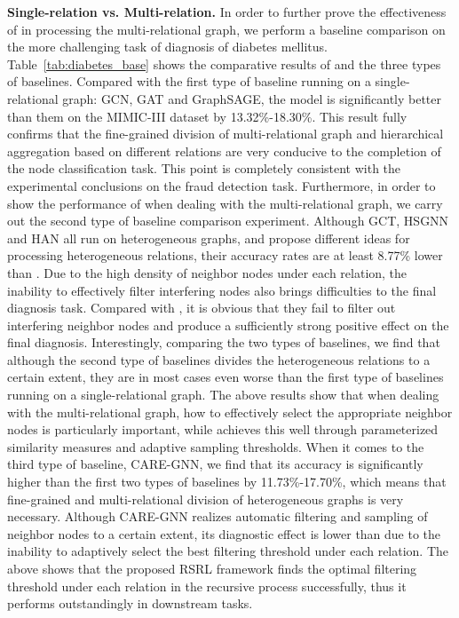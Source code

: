\textbf{Single-relation vs. Multi-relation.}
In order to further prove the effectiveness of \RioGNN in processing the multi-relational graph, we perform a baseline comparison on the more challenging task of diagnosis of diabetes mellitus.
Table~\ref{tab:diabetes_base} shows the comparative results of \RioGNN and the three types of baselines. 
Compared with the first type of baseline running on a single-relational graph: GCN, GAT and GraphSAGE, the model \RioGNN is significantly better than them on the MIMIC-III dataset by 13.32\%-18.30\%.
This result fully confirms that the fine-grained division of multi-relational graph and hierarchical aggregation based on different relations are very conducive to the completion of the node classification task. 
This point is completely consistent with the experimental conclusions on the fraud detection task. 
Furthermore, in order to show the performance of \RioGNN when dealing with the multi-relational graph, we carry out the second type of baseline comparison experiment.
Although GCT, HSGNN and HAN all run on heterogeneous graphs, and propose different ideas for processing heterogeneous relations, their accuracy rates are at least 8.77\% lower than \RioGNN. 
Due to the high density of neighbor nodes under each relation, the inability to effectively filter interfering nodes also brings difficulties to the final diagnosis task. 
Compared with \RioGNN, it is obvious that they fail to filter out interfering neighbor nodes and produce a sufficiently strong positive effect on the final diagnosis. 
Interestingly, comparing the two types of baselines, we find that although the second type of baselines divides the heterogeneous relations to a certain extent, they are in most cases even worse than the first type of baselines running on a single-relational graph. 
The above results show that when dealing with the multi-relational graph, how to effectively select the appropriate neighbor nodes is particularly important, while \RioGNN achieves this well through parameterized similarity measures and adaptive sampling thresholds. 
When it comes to the third type of baseline, CARE-GNN, we find that its accuracy is significantly higher than the first two types of baselines by 11.73\%-17.70\%, which means that fine-grained and multi-relational division of heterogeneous graphs is very necessary.
Although CARE-GNN realizes automatic filtering and sampling of neighbor nodes to a certain extent, its diagnostic effect is lower than \RioGNN due to the inability to adaptively select the best filtering threshold under each relation. 
The above shows that the proposed RSRL framework finds the optimal filtering threshold under each relation in the recursive process successfully, thus it performs outstandingly in downstream tasks.





